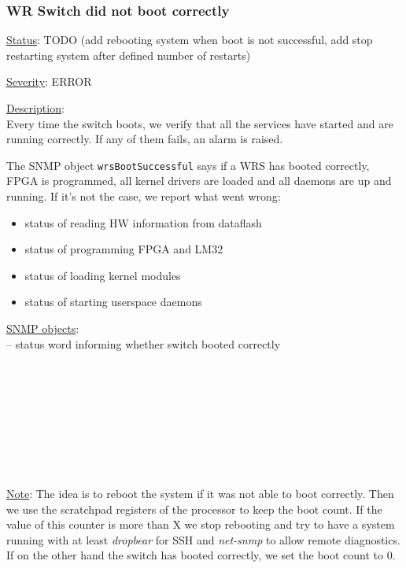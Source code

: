 \subsubsection{\bf WR Switch did not boot correctly}
		\label{fail:other:boot}
		\begin{packed_enum}
			\item [] \underline{Status}: TODO (add rebooting system when boot is
				 not successful, add stop restarting system after defined number of restarts)
			\item [] \underline{Severity}: ERROR
			\item [] \underline{Description}:\\
				Every time the switch boots, we verify that all the services have
				started and are running correctly. If any of them fails, an alarm is
				raised.

				The SNMP object \texttt{wrsBootSuccessful} says if a WRS has booted
				correctly, FPGA is programmed, all kernel drivers are loaded and all
				daemons are up and running. If it's not the case, we report what went
				wrong:
				\begin{itemize}
					\item status of reading HW information from dataflash
					\item status of programming FPGA and LM32
					\item status of loading kernel modules
					\item status of starting userspace daemons
				\end{itemize}
			\item [] \underline{SNMP objects}:\\
				 -- status word informing whether switch booted correctly\\
				\\
				\\
				\\
				\\
				\\
				\\
				\\
				\\
			\item [] \underline{Note}: 
				The idea is to reboot the system if it was not able to boot correctly.
				Then we use the scratchpad registers of the processor to keep
				the boot count. If the value of this counter is more than X we stop
				rebooting and try to have a system running with at least \emph{dropbear}
				for SSH and \emph{net-snmp} to allow remote diagnostics. If on the other
				hand the switch has booted correctly, we set the boot count to 0.
		\end{packed_enum}

